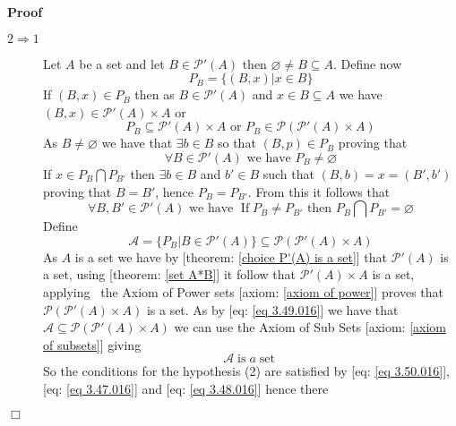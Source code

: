 \documentclass{book}
\newcommand{\tmop}[1]{\ensuremath{\operatorname{#1}}}
\newenvironment{proof}{\noindent\textbf{Proof\ }}{\hspace*{\fill}$\Box$\medskip}
\begin{document}
\begin{proof}
\begin{description}
    \item[$2 \Rightarrow 1$] Let $A$ be a set and let $B \in \mathcal{P}' (A)$
    then $\varnothing \neq B \subseteq A$. Define now
    \begin{equation}
      P_B = \{ (B, x) |x \in B \}
    \end{equation}
    If $(B, x) \in P_B$ then as $B \in \mathcal{P}' (A)$ and $x \in B
    \subseteq A$ we have $(B, x) \in \mathcal{P}' (A) \times A$ or
    \begin{equation}
      \label{eq 3.46.016} P_B \subseteq \mathcal{P}' (A) \times A \text{ or
      $P_B \in \mathcal{P} (\mathcal{P}' (A) \times A)$}
    \end{equation}
    As $B \neq \varnothing$ we have that $\exists b \in B$ so that $(B, p) \in
    P_B$ proving that
    \begin{equation}
      \label{eq 3.47.016} \forall B \in \mathcal{P}' (A) \text{ we have } P_B
      \neq \varnothing
    \end{equation}
    If $x \in P_B \bigcap P_{B'}$ then $\exists b \in B$ and $b' \in B$ such
    that $(B, b) = x = (B', b')$ proving that $B = B'$, hence $P_B = P_{B'}$.
    From this it follows that
    \begin{equation}
      \label{eq 3.48.016} \forall B, B' \in \mathcal{P}' (A) \text{ we have }
      \tmop{If} P_B \neq P_{B'} \text{ then $P_B \bigcap P_{B'} =
      \varnothing$}
    \end{equation}
    Define
    \begin{equation}
      \label{eq 3.49.016} \mathcal{A}= \{ P_B |B \in \mathcal{P}' (A) \}
      \subseteq \mathcal{P} (\mathcal{P}' (A) \times A)
    \end{equation}
    As $A$ is a set we have by [theorem: \ref{choice P'(A) is a set}] that
    $\mathcal{P}' (A)$ is a set, using [theorem: \ref{set A*B}] it follow that
    $\mathcal{P}' (A) \times A$ is a set, applying \ the Axiom of Power sets
    [axiom: \ref{axiom of power}] proves that $\mathcal{P} (\mathcal{P}' (A)
    \times A)$ is a set. As by [eq: \ref{eq 3.49.016}] we have that
    $\mathcal{A} \subseteq \mathcal{P} (\mathcal{P}' (A) \times A)$ we can use
    the Axiom of Sub Sets [axiom: \ref{axiom of subsets}] giving
    \begin{equation}
      \label{eq 3.50.016} \mathcal{A} \tmop{is} a \tmop{set}
    \end{equation}
    So the conditions for the hypothesis (2) are satisfied by [eq: \ref{eq
    3.50.016}],[eq: \ref{eq 3.47.016}] and [eq: \ref{eq 3.48.016}] hence there

\end{description}
\end{proof}
\end{document}
